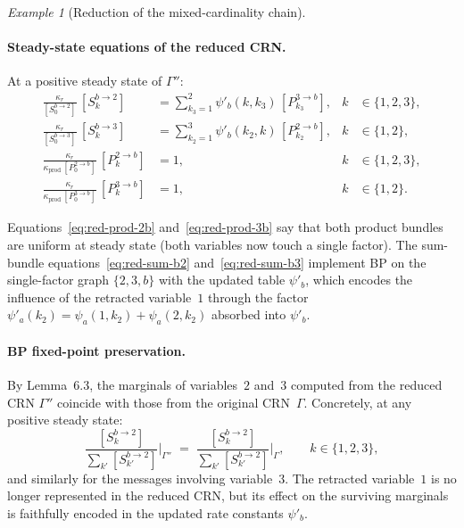 \documentclass{article}
\theoremstyle{plain}
\theoremstyle{definition}
\theoremstyle{remark}
\newtheorem{example}{Example}[section]
\newcommand{\<}{\langle}
\renewcommand{\>}{\rangle}
\begin{document}
\begin{example}[Reduction of the mixed-cardinality chain]
 
\paragraph{Steady-state equations of the reduced CRN.}
At a positive steady state of $\Gamma''$:
\begin{align}
\frac{\kappa_r}{[S^{b\to 2}_0]}\,[S^{b\to 2}_k]
&= \sum_{k_3=1}^{2}\psi'_b(k,k_3)\,[P^{3\to b}_{k_3}],
  &k&\in\{1,2,3\},
\label{eq:red-sum-b2}
\\[4pt]
\frac{\kappa_r}{[S^{b\to 3}_0]}\,[S^{b\to 3}_k]
&= \sum_{k_2=1}^{3}\psi'_b(k_2,k)\,[P^{2\to b}_{k_2}],
  &k&\in\{1,2\},
\label{eq:red-sum-b3}
\\[4pt]
\frac{\kappa_r}{\kappa_{\mathrm{prod}}\,[P^{2\to b}_0]}\,[P^{2\to b}_k]
&= 1,
  &k&\in\{1,2,3\},
\label{eq:red-prod-2b}
\\[4pt]
\frac{\kappa_r}{\kappa_{\mathrm{prod}}\,[P^{3\to b}_0]}\,[P^{3\to b}_k]
&= 1,
  &k&\in\{1,2\}.
\label{eq:red-prod-3b}
\end{align}
 
\noindent
Equations~\eqref{eq:red-prod-2b} and~\eqref{eq:red-prod-3b} say that
both product bundles are uniform at steady state (both variables now
touch a single factor).  The sum-bundle equations~\eqref{eq:red-sum-b2}
and~\eqref{eq:red-sum-b3} implement BP on the single-factor graph
$\{2,3,b\}$ with the updated table $\psi'_b$, which encodes the
influence of the retracted variable~$1$ through the
factor $\psi'_a(k_2) = \psi_a(1,k_2)+\psi_a(2,k_2)$
absorbed into $\psi'_b$.
 
\paragraph{BP fixed-point preservation.}
By Lemma~6.3, the marginals of variables~$2$ and~$3$ computed from the
reduced CRN $\Gamma''$ coincide with those from the original CRN~$\Gamma$.
Concretely, at any positive steady state:
\[
\frac{[S^{b\to 2}_k]}{\sum_{k'} [S^{b\to 2}_{k'}]}
\bigg|_{\Gamma''}
\;=\;
\frac{[S^{b\to 2}_k]}{\sum_{k'} [S^{b\to 2}_{k'}]}
\bigg|_{\Gamma},
\qquad k\in\{1,2,3\},
\]
and similarly for the messages involving variable~$3$.
The retracted variable~$1$ is no longer represented in the reduced CRN,
but its effect on the surviving marginals is faithfully encoded in the
updated rate constants $\psi'_b$.
 

\end{example}
\end{document}

